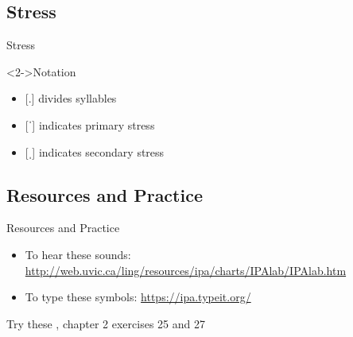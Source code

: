 \documentclass{beamer}
\newcommand{\subonefive}{Stress}
\newcommand{\subonesix}{Resources and Practice}
\begin{document}
    \subsection{\subonefive}
      \begin{frame}[t]{\subonefive}
        \begin{definition}
          
        \end{definition}
        \begin{block}<2->{Notation}
          \begin{itemize}
            \item {[}.] divides syllables
            \item {[}ˈ] indicates primary stress
            \item {[}ˌ] indicates secondary stress
          \end{itemize}
        \end{block}
      \end{frame}

    \subsection{\subonesix}
      \begin{frame}{\subonesix}
        \begin{block}{}
          \begin{itemize}
            \item To hear these sounds: \url{http://web.uvic.ca/ling/resources/ipa/charts/IPAlab/IPAlab.htm}
            \item To type these symbols: \url{https://ipa.typeit.org/}
          \end{itemize}
        \end{block}
        \begin{block}{Try these}
          \textcite{dawson_language_2016}, chapter 2 exercises 25 and 27
        \end{block}
      \end{frame}
\end{document}
